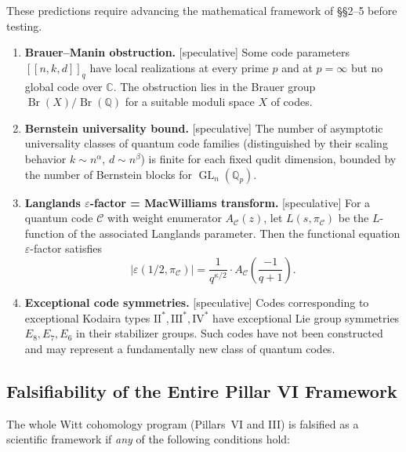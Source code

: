 \documentclass[12pt]{article}
\theoremstyle{definition}
\theoremstyle{plain}
\theoremstyle{remark}
\newcommand{\speculative}{{\color{gray!50!cyan}[\textsf{speculative}]}}
\newcommand{\Qp}{\mathbb{Q}_p}
\newcommand{\cC}{\mathcal{C}}
\begin{document}
These predictions require advancing the mathematical framework of \S\S2--5 before testing.

\begin{enumerate}[label=\textbf{T\arabic*.},leftmargin=*,resume]

  \item \textbf{Brauer--Manin obstruction.} \speculative
  Some code parameters $[[n,k,d]]_q$ have local realizations at every prime $p$
  and at $p=\infty$ but no global code over $\mathbb{C}$. The obstruction lies in the
  Brauer group $\operatorname{Br}(X)/\operatorname{Br}(\mathbb{Q})$ for a suitable
  moduli space $X$ of codes.

  \item \textbf{Bernstein universality bound.} \speculative
  The number of asymptotic universality classes of quantum code families (distinguished by their scaling behavior $k\sim n^\alpha$, $d\sim n^\beta$) is finite for each fixed qudit dimension, bounded by the number of Bernstein blocks for $\operatorname{GL}_n(\Qp)$.

  \item \textbf{Langlands $\varepsilon$-factor = MacWilliams transform.} \speculative
  For a quantum code $\cC$ with weight enumerator $A_{\cC}(z)$, let $L(s,\pi_{\cC})$ be the $L$-function of the associated Langlands parameter. Then the functional equation $\varepsilon$-factor satisfies
  \[
  |\varepsilon(1/2,\pi_{\cC})| = \frac{1}{q^{\kappa/2}}\cdot
  A_{\cC}\!\left(\frac{-1}{q+1}\right).
  \]

  \item \textbf{Exceptional code symmetries.} \speculative
  Codes corresponding to exceptional Kodaira types $\mathrm{II}^*,\mathrm{III}^*,\mathrm{IV}^*$ have exceptional Lie group symmetries $E_8,E_7,E_6$ in their stabilizer groups. Such codes have not been constructed and may represent a fundamentally new class of quantum codes.

\end{enumerate}

\subsection{Falsifiability of the Entire Pillar VI Framework}

The whole Witt cohomology program (Pillars~VI and III) is falsified as a scientific framework if \emph{any} of the following conditions hold:
\end{document}
